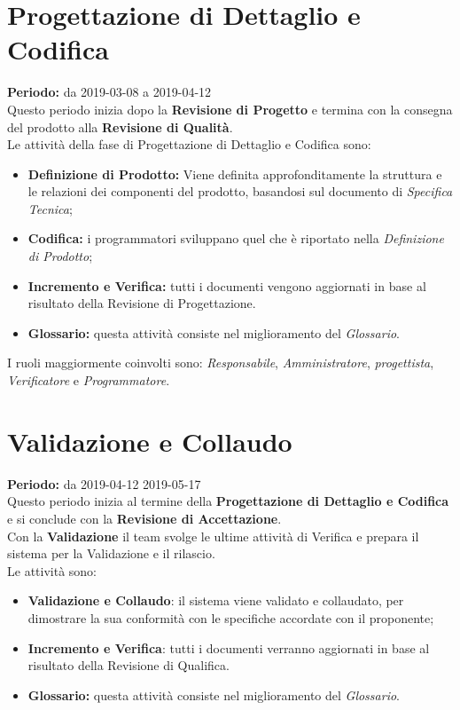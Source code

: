 \section{Progettazione di Dettaglio e Codifica}
\textbf{Periodo:} da 2019-03-08 a 2019-04-12\\
Questo periodo inizia dopo la \textbf{Revisione di Progetto} e termina con la consegna del prodotto alla \textbf{Revisione di Qualità}.\\Le attività della fase di Progettazione di Dettaglio e Codifica sono:
\begin{itemize}
    \item \textbf{Definizione di Prodotto:} Viene definita approfonditamente la struttura e le relazioni dei componenti del prodotto, basandosi sul documento di \textit{Specifica Tecnica};
    \item \textbf{Codifica:} i programmatori sviluppano quel che è riportato nella \textit{Definizione di Prodotto};
    \item \textbf{Incremento e Verifica:} tutti i documenti vengono aggiornati in base al risultato della Revisione di Progettazione.
    \item \textbf{Glossario:} questa attività consiste nel miglioramento del \textit{Glossario}.
\end{itemize}
I ruoli maggiormente coinvolti sono: \textit{Responsabile}, \textit{Amministratore}, \textit{progettista}, \textit{Verificatore} e \textit{Programmatore}.

\section{Validazione e Collaudo}
\textbf{Periodo:} da 2019-04-12 2019-05-17\\
Questo periodo inizia al termine della \textbf{Progettazione di Dettaglio e Codifica} e si conclude con la \textbf{Revisione di Accettazione}.\\Con la \textbf{Validazione} il team svolge le ultime attività di Verifica e prepara il sistema per la Validazione e il rilascio.\\
Le attività sono:
\begin{itemize}
    \item \textbf{Validazione e Collaudo}: il sistema viene validato e collaudato, per dimostrare la sua conformità con le specifiche accordate con il proponente;
    \item \textbf{Incremento e Verifica}: tutti i documenti verranno aggiornati in base al risultato della Revisione di Qualifica.
    \item \textbf{Glossario:} questa attività consiste nel miglioramento del \textit{Glossario}.
\end{itemize}
